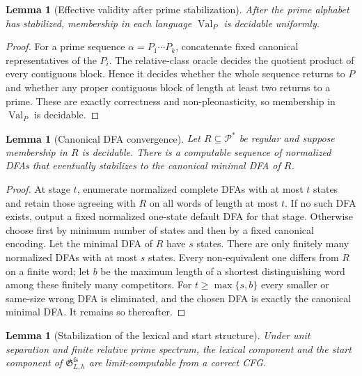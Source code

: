 \documentclass[11pt,a4paper]{article}
\newtheorem{lemma}[theorem]{Lemma}
\newcommand{\Pcal}{\mathcal P}
\newcommand{\Val}{\operatorname{Val}}
\begin{document}
\begin{lemma}[Effective validity after prime stabilization]
\label{lem:fsrp-validity-oracle}
After the prime alphabet has stabilized, membership in each language $\Val_P$ is decidable uniformly.
\end{lemma}

\begin{proof}
For a prime sequence $\alpha=P_1\cdots P_k$, concatenate fixed canonical representatives of the $P_i$.  The relative-class oracle decides the quotient product of every contiguous block.  Hence it decides whether the whole sequence returns to $P$ and whether any proper contiguous block of length at least two returns to a prime.  These are exactly correctness and non-pleonasticity, so membership in $\Val_P$ is decidable.
\end{proof}

\begin{lemma}[Canonical DFA convergence]
\label{lem:fsrp-dfa-convergence}
Let $R\subseteq\Pcal^*$ be regular and suppose membership in $R$ is decidable.  There is a computable sequence of normalized DFAs that eventually stabilizes to the canonical minimal DFA of $R$.
\end{lemma}

\begin{proof}
At stage $t$, enumerate normalized complete DFAs with at most $t$ states and retain those agreeing with $R$ on all words of length at most $t$.  If no such DFA exists, output a fixed normalized one-state default DFA for that stage.  Otherwise choose first by minimum number of states and then by a fixed canonical encoding.  Let the minimal DFA of $R$ have $s$ states.  There are only finitely many normalized DFAs with at most $s$ states.  Every non-equivalent one differs from $R$ on a finite word; let $b$ be the maximum length of a shortest distinguishing word among these finitely many competitors.  For $t\ge\max\{s,b\}$ every smaller or same-size wrong DFA is eliminated, and the chosen DFA is exactly the canonical minimal DFA.  It remains so thereafter.
\end{proof}

\begin{lemma}[Stabilization of the lexical and start structure]
\label{lem:fsrp-start-stabilization}
Under unit separation and finite relative prime spectrum, the lexical component and the start component of $\mathfrak G^{\mathrm{fs}}_{L,h}$ are limit-computable from a correct CFG.
\end{lemma}
\end{document}
